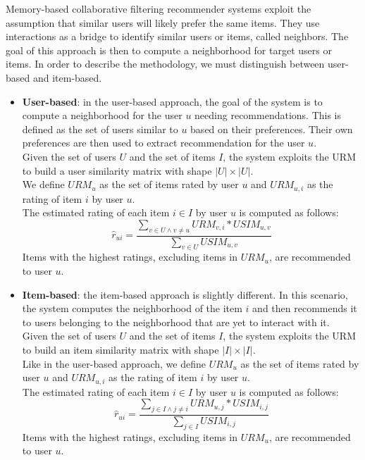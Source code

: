 Memory-based collaborative filtering recommender systems exploit the assumption that similar users will likely prefer the same items. They use interactions as a bridge to identify similar users or items, called neighbors. The goal of this approach is then to compute a neighborhood for target users or items. In order to describe the methodology, we must distinguish between user-based and item-based.

\begin{itemize}

\item \textbf{User-based}: in the user-based approach, the goal of the system is to compute a neighborhood for the user $u$ needing recommendations. This is defined as the set of users similar to $u$ based on their preferences. Their own preferences are then used to extract recommendation for the user $u$.\\
Given the set of users $U$ and the set of items $I$, the system exploits the URM to build a user similarity matrix with shape $|U| \times |U|$.\\
We define $URM_u$ as the set of items rated by user $u$ and $URM_{u,i}$ as the rating of item $i$ by user $u$.\\
The estimated rating of each item $i \in I$ by user $u$ is computed as follows:
\[ \hat{r}_{ui} = \frac{\sum_{v \in U \wedge v \neq u} URM_{v,i} * USIM_{u,v}}{\sum_{v \in U} USIM_{u,v}} \]
Items with the highest ratings, excluding items in $URM_u$, are recommended to user $u$.

\item \textbf{Item-based}: the item-based approach is slightly different. In this scenario, the system computes the neighborhood of the item $i$ and then recommends it to users belonging to the neighborhood that are yet to interact with it.\\
Given the set of users $U$ and the set of items $I$, the system exploits the URM to build an item similarity matrix with shape $|I| \times |I|$.\\
Like in the user-based approach, we define $URM_u$ as the set of items rated by user $u$ and $URM_{u,i}$ as the rating of item $i$ by user $u$.\\
The estimated rating of each item $i \in I$ by user $u$ is computed as follows:
\[ \hat{r}_{ui} = \frac{\sum_{j \in I \wedge j \neq i} URM_{u,j} * USIM_{i,j}}{\sum_{j \in I} USIM_{i,j}} \]
Items with the highest ratings, excluding items in $URM_u$, are recommended to user $u$.

\end{itemize}


